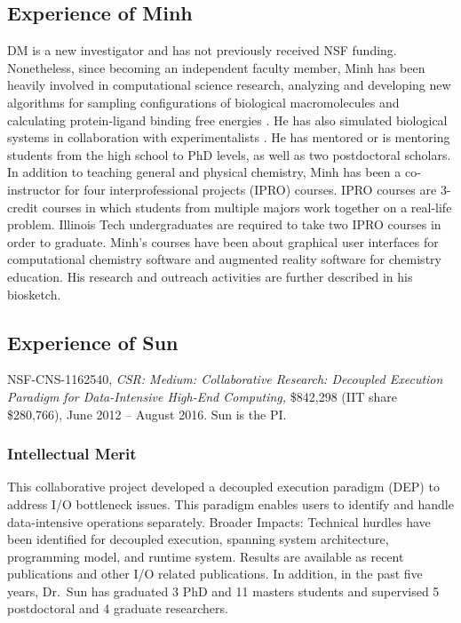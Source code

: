 \documentclass[11pt]{NSFamsart}
\begin{document}
\subsection{Experience of Minh}

DM is a new investigator and has not previously received NSF funding. Nonetheless, since becoming an independent faculty member, Minh has been heavily involved in computational science research, analyzing \cite{Nguyen2016} and developing new algorithms for sampling configurations of biological macromolecules \cite{Spiridon2017} and calculating protein-ligand binding free energies \cite{Minh2015, Xie2017a, Nguyen2017}. He has also simulated biological systems in collaboration with experimentalists \cite{Tuz2017}. He has mentored or is mentoring students from the high school to PhD levels, as well as two postdoctoral scholars. In addition to teaching general and physical chemistry, Minh has been a co-instructor for four interprofessional projects (IPRO) courses. IPRO courses are 3-credit courses in which students from multiple majors work together on a real-life problem. Illinois Tech undergraduates are required to take two IPRO courses in order to graduate. Minh's courses have been about graphical user interfaces for computational chemistry software and augmented reality software for chemistry education. His research and outreach activities are further described in his biosketch.

\subsection{Experience of Sun}  NSF-CNS-1162540, \emph{CSR: Medium: Collaborative Research: Decoupled Execution Paradigm for Data-Intensive High-End Computing,} \$842,298 (IIT share \$280,766), June 2012 -- August 2016. Sun is the PI.  
\subsubsection{Intellectual Merit} This collaborative project developed a decoupled execution paradigm (DEP) to address I/O bottleneck issues. This paradigm enables users to identify and handle data-intensive operations separately. Broader Impacts: Technical hurdles have been identified for decoupled execution, spanning system architecture, programming model, and runtime system. Results are available as recent publications \cite{HeWS16, HeWS16a, HWSX17, HWLS17, HWSH17, KYES16, SuWa14, WaSu14, ZLKR16} and other I/O related publications. In addition, in the past five years, Dr.~Sun has graduated 3 PhD and 11 masters students and supervised 5 postdoctoral and 4 graduate researchers.
\end{document}
